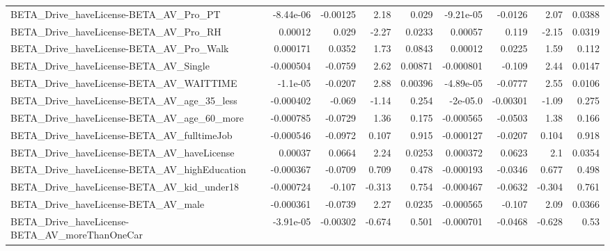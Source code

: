 \begin{tabular}{lrrrrrrrr}
BETA\_Drive\_haveLicense-BETA\_AV\_Pro\_PT              &   -8.44e-06 &     -0.00125 &      2.18 &    0.029 &  -9.21e-05 &     -0.0126 &         2.07 &        0.0388 \\
BETA\_Drive\_haveLicense-BETA\_AV\_Pro\_RH              &     0.00012 &        0.029 &     -2.27 &   0.0233 &    0.00057 &       0.119 &        -2.15 &        0.0319 \\
BETA\_Drive\_haveLicense-BETA\_AV\_Pro\_Walk            &    0.000171 &       0.0352 &      1.73 &   0.0843 &    0.00012 &      0.0225 &         1.59 &         0.112 \\
BETA\_Drive\_haveLicense-BETA\_AV\_Single              &   -0.000504 &      -0.0759 &      2.62 &  0.00871 &  -0.000801 &      -0.109 &         2.44 &        0.0147 \\
BETA\_Drive\_haveLicense-BETA\_AV\_WAITTIME            &    -1.1e-05 &      -0.0207 &      2.88 &  0.00396 &  -4.89e-05 &     -0.0777 &         2.55 &        0.0106 \\
BETA\_Drive\_haveLicense-BETA\_AV\_age\_35\_less         &   -0.000402 &       -0.069 &     -1.14 &    0.254 &   -2e-05.0 &    -0.00301 &        -1.09 &         0.275 \\
BETA\_Drive\_haveLicense-BETA\_AV\_age\_60\_more         &   -0.000785 &      -0.0729 &      1.36 &    0.175 &  -0.000565 &     -0.0503 &         1.38 &         0.166 \\
BETA\_Drive\_haveLicense-BETA\_AV\_fulltimeJob         &   -0.000546 &      -0.0972 &     0.107 &    0.915 &  -0.000127 &     -0.0207 &        0.104 &         0.918 \\
BETA\_Drive\_haveLicense-BETA\_AV\_haveLicense         &     0.00037 &       0.0664 &      2.24 &   0.0253 &   0.000372 &      0.0623 &          2.1 &        0.0354 \\
BETA\_Drive\_haveLicense-BETA\_AV\_highEducation       &   -0.000367 &      -0.0709 &     0.709 &    0.478 &  -0.000193 &     -0.0346 &        0.677 &         0.498 \\
BETA\_Drive\_haveLicense-BETA\_AV\_kid\_under18         &   -0.000724 &       -0.107 &    -0.313 &    0.754 &  -0.000467 &     -0.0632 &       -0.304 &         0.761 \\
BETA\_Drive\_haveLicense-BETA\_AV\_male                &   -0.000361 &      -0.0739 &      2.27 &   0.0235 &  -0.000565 &      -0.107 &         2.09 &        0.0366 \\
BETA\_Drive\_haveLicense-BETA\_AV\_moreThanOneCar      &   -3.91e-05 &     -0.00302 &    -0.674 &    0.501 &  -0.000701 &     -0.0468 &       -0.628 &          0.53 \\

\end{tabular}
